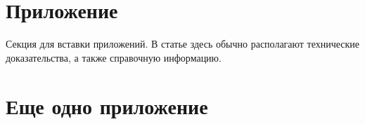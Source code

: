 \clearpage
\begin{appendices}
  \section{Приложение}
  Секция для вставки приложений.
  В статье здесь обычно располагают технические доказательства, а также справочную информацию.

  \section{Еще одно приложение}
\end{appendices}


